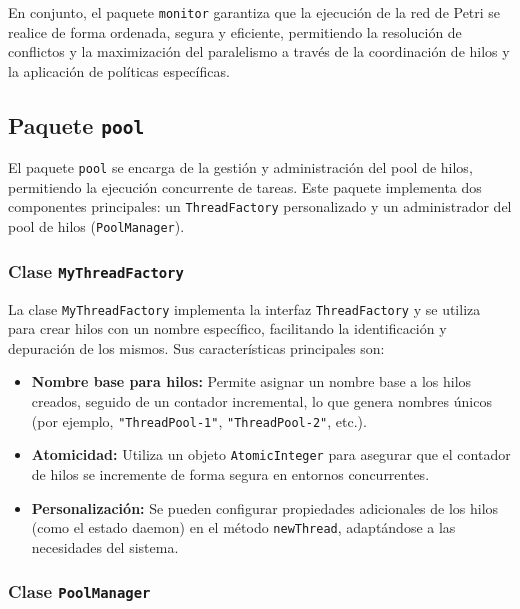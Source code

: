 \documentclass[12pt]{article}
\begin{document}
En conjunto, el paquete \texttt{monitor} garantiza que la ejecución de la red de Petri se realice de forma ordenada, segura y eficiente, permitiendo la resolución de conflictos y la maximización del paralelismo a través de la coordinación de hilos y la aplicación de políticas específicas.

\subsection{Paquete \texttt{pool}}

El paquete \texttt{pool} se encarga de la gestión y administración del pool de hilos, permitiendo la ejecución concurrente de tareas. Este paquete implementa dos componentes principales: un \texttt{ThreadFactory} personalizado y un administrador del pool de hilos (\texttt{PoolManager}).

\subsubsection{Clase \texttt{MyThreadFactory}}

La clase \texttt{MyThreadFactory} implementa la interfaz \texttt{ThreadFactory} y se utiliza para crear hilos con un nombre específico, facilitando la identificación y depuración de los mismos. Sus características principales son:
\begin{itemize}
    \item \textbf{Nombre base para hilos:} Permite asignar un nombre base a los hilos creados, seguido de un contador incremental, lo que genera nombres únicos (por ejemplo, \texttt{"ThreadPool-1"}, \texttt{"ThreadPool-2"}, etc.).
    \item \textbf{Atomicidad:} Utiliza un objeto \texttt{AtomicInteger} para asegurar que el contador de hilos se incremente de forma segura en entornos concurrentes.
    \item \textbf{Personalización:} Se pueden configurar propiedades adicionales de los hilos (como el estado daemon) en el método \texttt{newThread}, adaptándose a las necesidades del sistema.
\end{itemize}

\subsubsection{Clase \texttt{PoolManager}}
\end{document}
